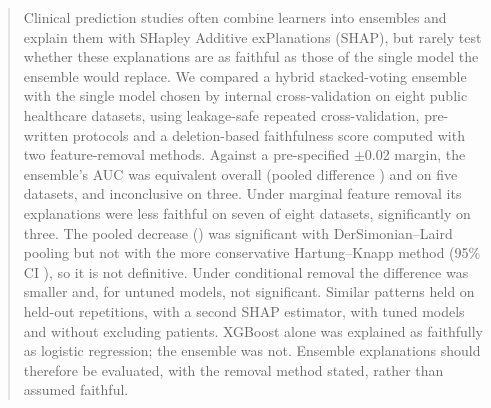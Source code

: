 \begin{abstract}
Clinical prediction studies often combine learners into ensembles and explain them with SHapley Additive exPlanations (SHAP), but rarely test whether these explanations are as faithful as those of the single model the ensemble would replace. We compared a hybrid stacked-voting ensemble with the single model chosen by internal cross-validation on eight public healthcare datasets, using leakage-safe repeated cross-validation, pre-written protocols and a deletion-based faithfulness score computed with two feature-removal methods. Against a pre-specified $\pm$0.02 margin, the ensemble's AUC was equivalent overall (pooled difference \Nauc) and on five datasets, and inconclusive on three. Under marginal feature removal its explanations were less faithful on seven of eight datasets, significantly on three. The pooled decrease (\Nndf) was significant with DerSimonian--Laird pooling but not with the more conservative Hartung--Knapp method (95\% CI \Nndfhk), so it is not definitive. Under conditional removal the difference was smaller and, for untuned models, not significant. Similar patterns held on held-out repetitions, with a second SHAP estimator, with tuned models and without excluding patients. XGBoost alone was explained as faithfully as logistic regression; the ensemble was not. Ensemble explanations should therefore be evaluated, with the removal method stated, rather than assumed faithful.
\end{abstract}
